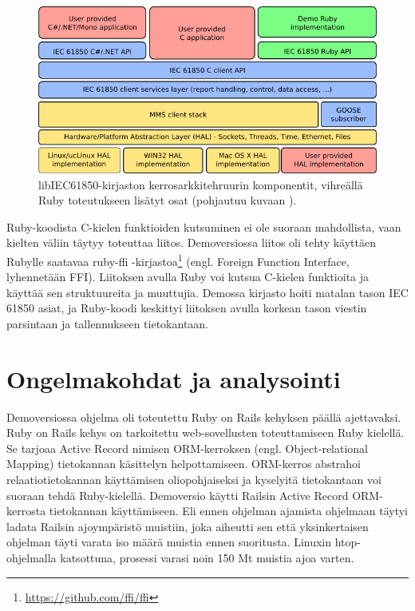 \begin{figure}
	\includegraphics[width=1\textwidth]{pictures/libiec61850-layer-architecture.png}
	\caption{libIEC61850-kirjaston kerrosarkkitehruurin komponentit, vihreällä Ruby toteutukseen lisätyt osat (pohjautuu kuvaan \cite{libIEC61850-api-overview}).}
	\label{fig:libiec61850-layer-architecture}
\end{figure}

Ruby-koodista C-kielen funktioiden kutsuminen ei ole suoraan mahdollista, vaan kielten väliin täytyy toteuttaa liitos. Demoversiossa liitos oli tehty käyttäen Rubylle saatavaa ruby-ffi -kirjastoa\footnote{\url{https://github.com/ffi/ffi}} (engl. Foreign Function Interface, lyhennetään FFI). Liitoksen avulla Ruby voi kutsua C-kielen funktioita ja käyttää sen struktuureita ja muuttujia. Demossa kirjasto hoiti matalan tason IEC 61850 asiat, ja Ruby-koodi keskittyi liitoksen avulla korkean tason viestin parsintaan ja tallennukseen tietokantaan.


\section{Ongelmakohdat ja analysointi}
Demoversiossa ohjelma oli toteutettu Ruby on Rails kehyksen päällä ajettavaksi. Ruby on Rails kehys on tarkoitettu web-sovellusten toteuttamiseen Ruby kielellä. Se tarjoaa Active Record nimisen ORM-kerroksen (engl. Object-relational Mapping) tietokannan käsittelyn helpottamiseen. ORM-kerros abstrahoi relaatiotietokannan käyttämisen oliopohjaiseksi ja kyselyitä tietokantaan voi suoraan tehdä Ruby-kielellä. Demoversio käytti Railsin Active Record ORM-kerrosta tietokannan käyttämiseen. Eli ennen ohjelman ajamista ohjelmaan täytyi ladata Railsin ajoympäristö muistiin, joka aiheutti sen että yksinkertaisen ohjelman täyti varata iso määrä muistia ennen suoritusta. Linuxin htop-ohjelmalla katsottuna, prosessi varasi noin 150 Mt muistia ajoa varten.

